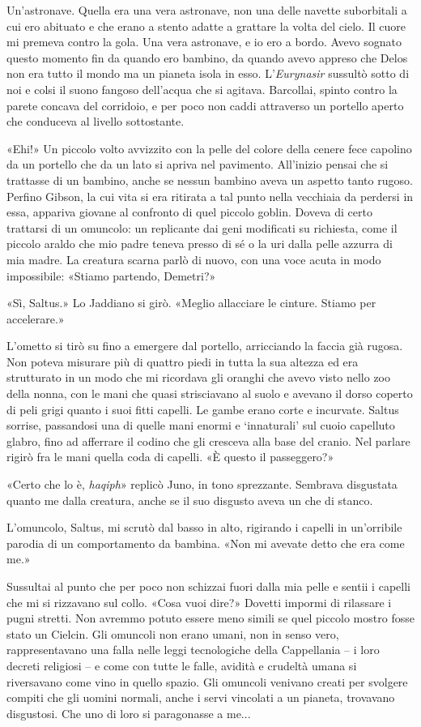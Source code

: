 Un'astronave. Quella era una vera astronave, non una delle navette
suborbitali a cui ero abituato e che erano a stento adatte a grattare la
volta del cielo. Il cuore mi premeva contro la gola. Una vera astronave,
e io ero a bordo. Avevo sognato questo momento fin da quando ero
bambino, da quando avevo appreso che Delos non era tutto il mondo ma un
pianeta isola in esso. L'\emph{Eurynasir} sussultò sotto di noi e colsi
il suono fangoso dell'acqua che si agitava. Barcollai, spinto contro la
parete concava del corridoio, e per poco non caddi attraverso un
portello aperto che conduceva al livello sottostante.

«Ehi!» Un piccolo volto avvizzito con la pelle del colore della cenere
fece capolino da un portello che da un lato si apriva nel pavimento.
All'inizio pensai che si trattasse di un bambino, anche se nessun
bambino aveva un aspetto tanto rugoso. Perfino Gibson, la cui vita si
era ritirata a tal punto nella vecchiaia da perdersi in essa, appariva
giovane al confronto di quel piccolo goblin. Doveva di certo trattarsi
di un omuncolo: un replicante dai geni modificati su richiesta, come il
piccolo araldo che mio padre teneva presso di sé o la uri dalla pelle
azzurra di mia madre. La creatura scarna parlò di nuovo, con una voce
acuta in modo impossibile: «Stiamo partendo, Demetri?»

«Sì, Saltus.» Lo Jaddiano si girò. «Meglio allacciare le cinture. Stiamo
per accelerare.»

L'ometto si tirò su fino a emergere dal portello, arricciando la faccia
già rugosa. Non poteva misurare più di quattro piedi in tutta la sua
altezza ed era strutturato in un modo che mi ricordava gli oranghi che
avevo visto nello zoo della nonna, con le mani che quasi strisciavano al
suolo e avevano il dorso coperto di peli grigi quanto i suoi fitti
capelli. Le gambe erano corte e incurvate. Saltus sorrise, passandosi
una di quelle mani enormi e `innaturali' sul cuoio capelluto glabro,
fino ad afferrare il codino che gli cresceva alla base del cranio. Nel
parlare rigirò fra le mani quella coda di capelli. «È questo il
passeggero?»

«Certo che lo è, \emph{haqiph}» replicò Juno, in tono sprezzante.
Sembrava disgustata quanto me dalla creatura, anche se il suo disgusto
aveva un che di stanco.

L'omuncolo, Saltus, mi scrutò dal basso in alto, rigirando i capelli in
un'orribile parodia di un comportamento da bambina. «Non mi avevate
detto che era come me.»

Sussultai al punto che per poco non schizzai fuori dalla mia pelle e
sentii i capelli che mi si rizzavano sul collo. «Cosa vuoi dire?»
Dovetti impormi di rilassare i pugni stretti. Non avremmo potuto essere
meno simili se quel piccolo mostro fosse stato un Cielcin. Gli omuncoli
non erano umani, non in senso vero, rappresentavano una falla nelle
leggi tecnologiche della Cappellania -- i loro decreti religiosi -- e
come con tutte le falle, avidità e crudeltà umana si riversavano come
vino in quello spazio. Gli omuncoli venivano creati per svolgere compiti
che gli uomini normali, anche i servi vincolati a un pianeta, trovavano
disgustosi. Che uno di loro si paragonasse a me...

